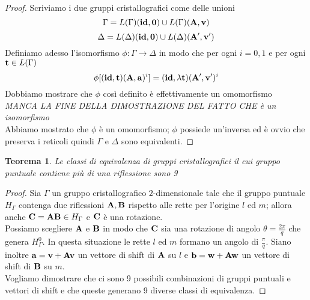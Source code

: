 \documentclass[a4paper,11pt,openright,twoside	]{book}
\newtheorem{theorem}{Teorema}[section]
\begin{document}
\begin{proof}
Scriviamo i due gruppi cristallografici come delle unioni
\[ \Gamma = L(\Gamma)(\vb{id, 0}) \cup L(\Gamma)(\vb{A, v}) \]
\[ \Delta = L(\Delta)(\vb{id, 0}) \cup L(\Delta)(\vb{A', v'})  \]
Definiamo adesso l'isomorfismo $\phi : \Gamma \longrightarrow \Delta$ in modo che per ogni $i = 0, 1$ e per ogni $\vb{t} \in L(\Gamma)$ 
\[ \phi[(\vb{id, t})(\vb{A, a})^i] = (\vb{id}, \lambda\vb{t})(\vb{A', v'})^i \]
Dobbiamo mostrare che $\phi$ così definito è effettivamente un omomorfismo \\
\emph{MANCA LA FINE DELLA DIMOSTRAZIONE DEL FATTO CHE è un isomorfismo} \\
Abbiamo mostrato che $\phi$ è un omomorfismo; $\phi$ possiede un'inversa ed è ovvio che preserva i reticoli quindi $\Gamma$ e $\Delta$ sono equivalenti.  
\end{proof}

\begin{theorem}
Le classi di equivalenza di gruppi cristallografici il cui gruppo puntuale contiene più di una riflessione sono 9
\end{theorem}

\begin{proof}
Sia $\Gamma$ un gruppo cristallografico $2$-dimensionale tale che il gruppo puntuale $H_{\Gamma}$ contenga due riflessioni $\vb{A}, \vb{B}$ rispetto alle rette per l'origine $l$ ed $m$; allora anche $\vb{C} = \vb{AB} \in H_{\Gamma}$ e $\vb{C}$ è una rotazione. \\
Possiamo scegliere $\vb{A}$ e  $\vb{B}$ in modo che $\vb{C}$ sia una rotazione di angolo $\theta = \frac{2 \pi}{q}$ che genera $H_{\Gamma}^0$. In questa situazione le rette $l$ ed $m$ formano un angolo di $\frac{\pi}{q}$. 
Siano inoltre $\vb{a} = \vb{v + Av}$ un vettore di shift di $\vb{A}$ su $l$ e $\vb{b} = \vb{w + Aw}$ un vettore di shift di $\vb{B}$ su $m$.\\
Vogliamo dimostrare che ci sono 9 possibili combinazioni di gruppi puntuali e vettori di shift e che queste generano 9 diverse classi di equivalenza. 
\end{proof}
\end{document}
